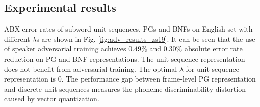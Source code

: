 \documentclass[a4paper]{article}
\begin{document}
\subsection{Experimental results}
ABX error rates of subword unit sequences, PGs and BNFs on English set with different $\lambda$s are shown in Fig. \ref{fig:adv_results_zs19}. It can be seen that the use of speaker adversarial training achieves $0.49\%$ and $0.30\%$ absolute error rate reduction on PG and BNF representations.
The unit sequence representation  does not benefit from adversarial training.
The optimal $\lambda$ for  unit sequence representation is $0$.
The  performance gap between frame-level PG representation and discrete unit sequences measures the phoneme discriminability distortion caused by vector quantization. 
 
\end{document}
